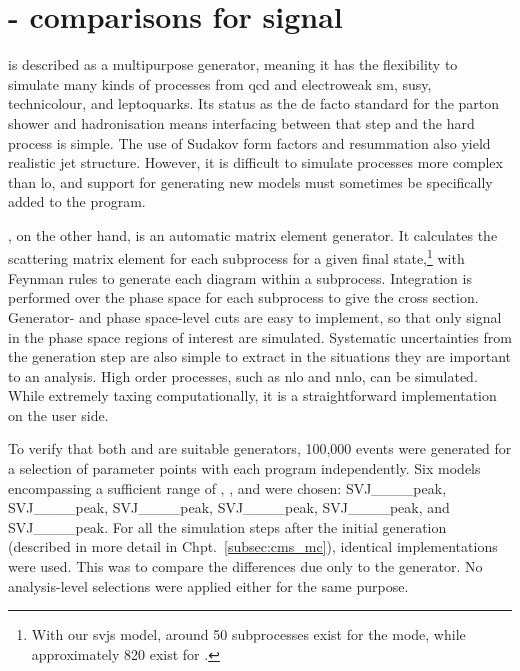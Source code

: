 

\section{\texorpdfstring{\PYTHIA}{Pythia}-\texorpdfstring{\MADGRAPH}{MadGraph} comparisons for \texorpdfstring{\schannel}{s-channel} signal}
\label{sec:svj_schannel_comparisons}


\PYTHIAEIGHT is described as a multipurpose generator, meaning it has the flexibility to simulate many kinds of processes from \acrshort{qcd} and electroweak \acrshort{sm}, \acrshort{susy}, technicolour, and leptoquarks. Its status as the de facto standard for the parton shower and hadronisation means interfacing between that step and the hard process is simple. The use of Sudakov form factors and resummation also yield realistic jet structure. However, it is difficult to simulate processes more complex than \acrshort{lo}, and support for generating new models must sometimes be specifically added to the program.

\MGvATNLO, on the other hand, is an automatic matrix element generator. It calculates the scattering matrix element for each subprocess for a given final state,\footnote{With our \glspl{svj} model, around 50 subprocesses exist for the \schannel mode, while approximately 820 exist for \tchannel.} with Feynman rules to generate each diagram within a subprocess. Integration is performed over the phase space for each subprocess to give the cross section. Generator- and phase space-level cuts are easy to implement, so that only signal in the phase space regions of interest are simulated. Systematic uncertainties from the generation step are also simple to extract in the situations they are important to an analysis. High order processes, such as \acrshort{nlo} and \acrshort{nnlo}, can be simulated. While extremely taxing computationally, it is a straightforward implementation on the user side.

To verify that both \PYTHIA and \MADGRAPH are suitable generators, 100,000 events were generated for a selection of parameter points with each program independently. Six models encompassing a sufficient range of \mZprime, \mDark, and \rinv were chosen: SVJ\_\_\_\_\-peak, SVJ\_\_\_\_peak, SVJ\_\_\_\_\-peak, SVJ\_\_\_\_\-peak, SVJ\_\_\_\_\-peak, and SVJ\_\_\_\_\-peak. For all the simulation steps after the initial generation (described in more detail in Chpt.~\ref{subsec:cms_mc}), identical implementations were used. This was to compare the differences due only to the generator. No analysis-level selections were applied either for the same purpose.

